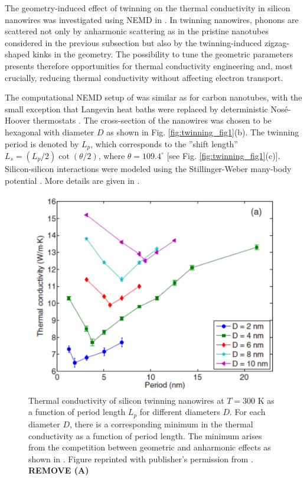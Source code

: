 The geometry-induced effect of twinning on the thermal conductivity in silicon nanowires was investigated using NEMD in . In twinning nanowires, phonons are scattered not only by anharmonic scattering as in the pristine nanotubes considered in the previous subsection but also by the twinning-induced zigzag-shaped kinks in the geometry. The possibility to tune the geometric parameters presents therefore opportunities for thermal conductivity engineering and, most crucially, reducing thermal conductivity without affecting electron transport. 

The computational NEMD setup of  was similar as for carbon nanotubes, with the small exception that Langevin heat baths were replaced by deterministic Nos\'e-Hoover thermostats \cite{nose84}. The cross-section of the nanowires was chosen to be hexagonal with diameter $D$ as shown in Fig. \ref{fig:twinning_fig1}(b). The twinning period is denoted by $L_p$, which corresponds to the ''shift length'' $L_s=(L_p/2)\cot(\theta/2)$, where $\theta=109.4^{\circ}$ [see Fig. \ref{fig:twinning_fig1}(c)]. Silicon-silicon interactions were modeled using the Stillinger-Weber many-body potential \cite{stillinger85}. More details are given in .


\begin{figure}[tb]
 \begin{center}
  \includegraphics[width=.89\columnwidth]{pics/twinning_fig2a.pdf} 
  \caption{Thermal conductivity of silicon twinning nanowires at $T=300$ K as a function of period length $L_p$ for different diameters $D$. For each diameter $D$, there is a corresponding minimum in the thermal conductivity as a function of period length. The minimum arises from the competition between geometric and anharmonic effects as shown in . Figure reprinted with publisher's permission from . \textbf{REMOVE (A)}}  
\label{fig:twinning_fig2}
 \end{center}
\end{figure}

